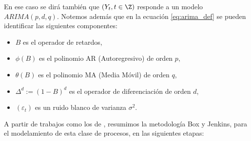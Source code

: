 \documentclass[12pt,oneside]{book}\usepackage[]{graphicx}\usepackage[]{color}
\theoremstyle{definition} %
\begin{document}
En ese caso se dirá también que $(Y_t, t \in \Z)$ responde a un modelo $ARIMA(p,d,q)$. Notemos además que en la ecuación \ref{eq:arima_def} se pueden identificar las siguientes componentes:

\begin{itemize}
\item $B$ es el operador de retardos,
\item $\phi(B)$ es el polinomio AR (Autoregresivo) de orden $p$,
\item $\theta  (B)$ es el polinomio MA (Media Móvil) de orden $q$,
\item $\Delta^d:=(1-B)^d$ es el operador de diferenciación de orden $d$,
\item $(\varepsilon_t)$ es un ruido blanco de varianza $\sigma^2$.
\end{itemize}



A partir de trabajos como los de \citeauthor{chatfield1996,capa2016seriest}, resumimos la metodología Box y Jenkins, para el modelamiento de esta clase de procesos, en las siguientes etapas:
\end{document}
